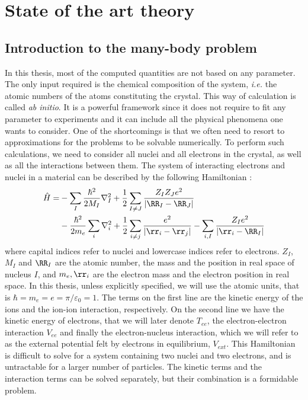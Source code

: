 \chapter{ State of the art theory}
\chaptertoc{}
%
\linenumbers

%
\section{Introduction to the many-body problem} \label{sec:BO_approx}
In this thesis, most of the computed quantities are not based on any parameter. The only input required is the chemical composition of the system, \textit{i.e.} the atomic numbers of the atoms constituting the crystal. This way of calculation is called \textit{ab initio}. It is a powerful framework since it does not require to fit any parameter to experiments and it can include all the physical phenomena one wants to consider. One of the shortcomings is that we often need to resort to approximations for the problems to be solvable numerically.
To perform such calculations, we need to consider all nuclei and all electrons in the crystal, as well as all the interactions between them. The system of interacting electrons and nuclei in a material can be described by the following Hamiltonian :
\begin{align}
	\hat{H} = &- \sum_I \frac{\hbar^2}{2 M_I} \nabla^2_I + \frac{1}{2} \sum_{I\neq J} \frac{Z_I Z_J e^2}{\left| \RR_I - \RR_J \right|} \nonumber \\
	&- \frac{\hbar^2}{2m_e} \sum_i \nabla^2_i + \frac{1}{2} \sum_{i\neq j} \frac{e^2}{\left| \rr_i - \rr_j \right|} - \sum_{i,I} \frac{Z_I e^2}{\left|\rr_i - \RR_I \right|}
\end{align}
where capital indices refer to nuclei and lowercase indices refer to electrons. $Z_I$, $M_I$ and $\RR_I$ are the atomic number, the mass and the position in real space of nucleus $I$, and $m_e,\rr_i$ are the electron mass and the electron position in real space. In this thesis, unless explicitly specified, we will use the atomic units, that is $\hbar = m_e = e =\pi/\varepsilon_0 =1$.
The terms on the first line are the kinetic energy of the ions and the ion-ion interaction, respectively. On the second line we have the kinetic energy of electrons, that we will later denote $T_{ee}$, the electron-electron interaction $V_{ee}$ and finally the electron-nucleus interaction, which we will refer to as the external potential felt by electrons in equilibrium, $V_{ext}$. This Hamiltonian is difficult to solve for a system containing two nuclei and two electrons, and is untractable for a larger number of particles. The kinetic terms and the interaction terms can be solved separately, but their combination is a formidable problem.
